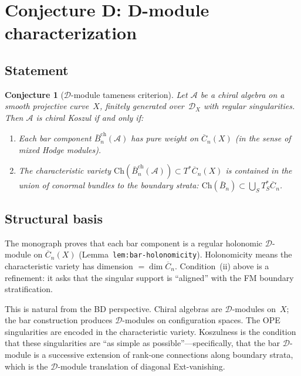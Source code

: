 \documentclass[11pt]{article}
\newcommand{\cA}{\mathcal{A}}
\newcommand{\cD}{\mathcal{D}}
\newcommand{\barB}{\bar{B}}
\theoremstyle{plain}
\newtheorem{conjecture}{Conjecture}[section]
\theoremstyle{definition}
\theoremstyle{remark}
\begin{document}
\section{Conjecture D: D-module characterization}
\label{sec:d-module}

\subsection{Statement}

\begin{conjecture}[$\cD$-module tameness criterion]
\label{conj:d-module}
Let $\cA$ be a chiral algebra on a smooth projective curve~$X$,
finitely generated over~$\cD_X$ with regular singularities.
Then $\cA$ is chiral Koszul if and only if:
\begin{enumerate}[label=(\roman*)]
\item Each bar component $\barB_n^{\mathrm{ch}}(\cA)$ has
  \emph{pure} weight on $\overline{C}_n(X)$ (in the sense of
  mixed Hodge modules).
\item The characteristic variety
  $\mathrm{Ch}(\barB_n^{\mathrm{ch}}(\cA)) \subset T^*\overline{C}_n(X)$
  is contained in the union of conormal bundles to the boundary
  strata: $\mathrm{Ch}(\barB_n) \subset \bigcup_S T^*_S \overline{C}_n$.
\end{enumerate}
\end{conjecture}

\subsection{Structural basis}

The monograph proves that each bar component is a regular holonomic
$\cD$-module on $\overline{C}_n(X)$
(Lemma~\texttt{lem:bar-holonomicity}).  Holonomicity means the
characteristic variety has dimension $= \dim \overline{C}_n$.
Condition~(ii) above is a refinement: it asks that the singular
support is ``aligned'' with the FM boundary stratification.

This is natural from the BD perspective.  Chiral algebras are
$\cD$-modules on~$X$; the bar construction produces $\cD$-modules
on configuration spaces.  The OPE singularities are encoded in
the characteristic variety.  Koszulness is the condition that
these singularities are ``as simple as possible''---specifically,
that the bar $\cD$-module is a successive extension of rank-one
connections along boundary strata, which is the $\cD$-module
translation of diagonal Ext-vanishing.
\end{document}
